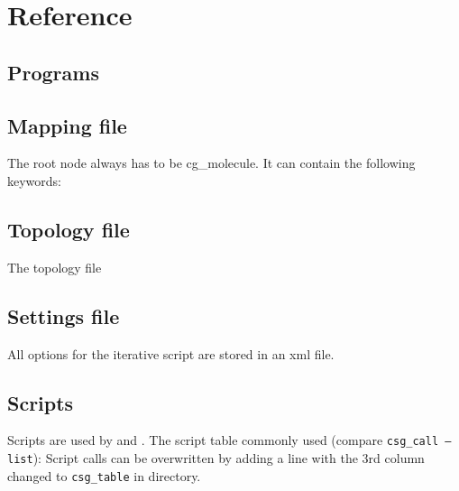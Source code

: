 \chapter{Reference}
\section{Programs}
\label{sec:ref_programs}
%
\section{Mapping file}
\label{sec:ref_mapping}
The root node always has to be cg\_molecule. It can contain the following keywords:



\section{Topology file}
\label{sec:ref_topology}
The \xml topology file



\section{Settings file}
All options for the iterative script are stored in an xml file.
\label{sec:ref_options}

\vfill

\section{Scripts}
\label{sec:csg_table}
Scripts are used by  and .
The script table commonly used (compare \texttt{csg\_call --list}): 
%
Script calls can be overwritten by adding a line with the 3rd column changed to \texttt{csg\_table} in  directory.
%
